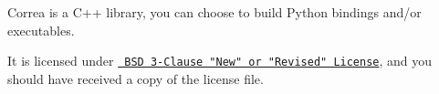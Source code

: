 \label{index_md__r_e_a_d_m_e}%
%
 Correa is a C++ library, you can choose to build Python bindings and/or executables.

It is licensed under \href{md__l_i_c_e_n_s_e.html}{\texttt{ BSD 3-\/Clause "{}New"{} or "{}Revised"{} License}}, and you should have received a copy of the license file. 